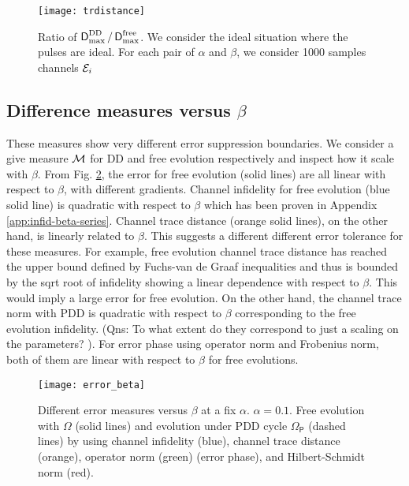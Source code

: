 \documentclass[aps,pra,reprint,superscriptaddress]{revtex4-2}
\newcommand{\Opdd}{\Omega_{\mathsf{P}}}
\begin{document}
\begin{figure}
    \centering
    \texttt{[image: trdistance]}
    \caption{Ratio of $\operatorname{\mathsf{D}}^{\rm DD}_{\rm max} / \operatorname{\mathsf{D}}^{\rm free}_{\rm max}$. We consider the ideal situation where the pulses are ideal. For each pair of $\alpha$ and $\beta$, we consider 1000 samples channels ${\mathcal{E}}_i$} 
    \label{fig:pdd-region-trdistance}
\end{figure}


\subsection{Difference measures versus $\beta$}
These measures show very different error suppression boundaries. We consider a give measure $\mathcal{M}$ for DD and free evolution respectively and inspect how it scale with $\beta$. From Fig. \ref{fig:pdd-region-beta}, the error for free evolution (solid lines) are all linear with respect to $\beta$, with different gradients. Channel infidelity for free evolution (blue solid line) is quadratic with respect to $\beta$ which has been proven in Appendix \ref{app:infid-beta-series}. Channel trace distance (orange solid lines), on the other hand, is linearly related to $\beta$. This suggests a different different error tolerance for these measures. For example, free evolution channel trace distance has reached the upper bound defined by Fuchs-van de Graaf inequalities and thus is bounded by the sqrt root of infidelity showing a linear dependence with respect to $\beta$. This would imply a large error for free evolution. On the other hand, the channel trace norm with PDD is quadratic with respect to $\beta$ corresponding to the free evolution infidelity. ({Qns: \color{red} To what extent do they correspond to just a scaling on the parameters?} ). For error phase using operator norm and Frobenius norm, both of them are linear with respect to $\beta$ for free evolutions.

\begin{figure}
    \centering
    \texttt{[image: error\_beta]}
    \caption{Different error measures versus $\beta$ at a fix $\alpha$. $\alpha=0.1$. Free evolution with $\Omega$ (solid lines) and evolution under PDD cycle $\Opdd$ (dashed lines) by using channel infidelity (blue), channel trace distance (orange), operator norm (green) (error phase), and Hilbert-Schmidt norm (red).} 
    \label{fig:pdd-region-beta}
\end{figure}
\end{document}
